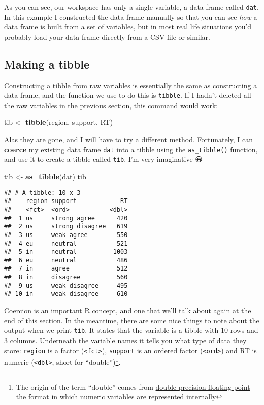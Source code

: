 \documentclass[]{book}
\newenvironment{Shaded}{\begin{snugshade}}{\end{snugshade}}
\newcommand{\KeywordTok}[1]{\textcolor[rgb]{0.13,0.29,0.53}{\textbf{#1}}}
\newcommand{\NormalTok}[1]{#1}
\newcommand{\StringTok}[1]{\textcolor[rgb]{0.31,0.60,0.02}{#1}}
\let\rmarkdownfootnote\footnote%
\def\footnote{\protect\rmarkdownfootnote}
\begin{document}
As you can see, our workspace has only a single variable, a data frame called \texttt{dat}. In this example I constructed the data frame manually so that you can see \emph{how} a data frame is built from a set of variables, but in most real life situations you'd probably load your data frame directly from a CSV file or similar.

\hypertarget{making-a-tibble}{%
\subsection{Making a tibble}\label{making-a-tibble}}

Constructing a tibble from raw variables is essentially the same as constructing a data frame, and the function we use to do this is \texttt{tibble}. If I hadn't deleted all the raw variables in the previous section, this command would work:

\begin{Shaded}
\begin{Highlighting}[]
\NormalTok{tib <-}\StringTok{ }\KeywordTok{tibble}\NormalTok{(region, support, RT)}
\end{Highlighting}
\end{Shaded}

Alas they are gone, and I will have to try a different method. Fortunately, I can \textbf{coerce} my existing data frame \texttt{dat} into a tibble using the \texttt{as\_tibble()} function, and use it to create a tibble called \texttt{tib}. I'm very imaginative 😀

\begin{Shaded}
\begin{Highlighting}[]
\NormalTok{tib <-}\StringTok{ }\KeywordTok{as_tibble}\NormalTok{(dat)}
\NormalTok{tib}
\end{Highlighting}
\end{Shaded}

\begin{verbatim}
## # A tibble: 10 x 3
##    region support            RT
##    <fct>  <ord>           <dbl>
##  1 us     strong agree      420
##  2 us     strong disagree   619
##  3 us     weak agree        550
##  4 eu     neutral           521
##  5 in     neutral          1003
##  6 eu     neutral           486
##  7 in     agree             512
##  8 in     disagree          560
##  9 us     weak disagree     495
## 10 in     weak disagree     610
\end{verbatim}

Coercion is an important R concept, and one that we'll talk about again at the end of this section. In the meantime, there are some nice things to note about the output when we print \texttt{tib}. It states that the variable is a tibble with 10 rows and 3 columns. Underneath the variable names it tells you what type of data they store: \texttt{region} is a factor (\texttt{\textless{}fct\textgreater{}}), \texttt{support} is an ordered factor (\texttt{\textless{}ord\textgreater{}}) and RT is numeric (\texttt{\textless{}dbl\textgreater{}}, short for ``double'')\footnote{The origin of the term ``double'' comes from \href{https://en.wikipedia.org/wiki/Double-precision_floating-point_format}{double precision floating point} the format in which numeric variables are represented internally}.
\end{document}
